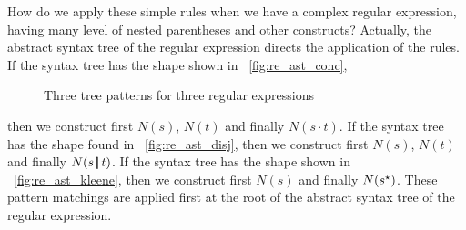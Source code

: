 How do we apply these simple rules when we have a complex regular
expression, having many level of nested parentheses and other
constructs? Actually, the abstract syntax tree of the regular
expression directs the application of the rules. If the syntax tree
has the shape shown in \fig~\vref{fig:re_ast_conc},
\begin{figure}[b]
\centering
{}
\qquad
{}
\qquad
{}
\caption{Three tree patterns for three regular expressions}
\end{figure}
then we construct first \(N(s)\), \(N(t)\) and finally \(N(s \cdot
t)\). If the syntax tree has the shape found in
\fig~\vref{fig:re_ast_disj}, then we construct first \(N(s)\),
\(N(t)\) and finally \(N (s \, \text{\disj} \, t)\). If the syntax
tree has the shape shown in \fig~\vref{fig:re_ast_kleene}, then we
construct first \(N(s)\) and finally \(N(s\text{\kleene})\). These
pattern matchings are applied first at the root of the abstract syntax
tree of the regular expression.
